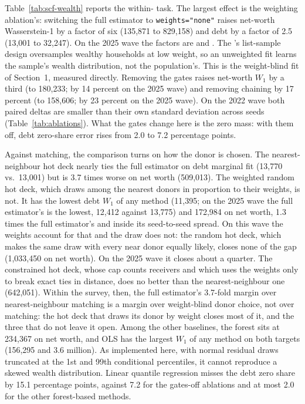 Table~\ref{tab:scf-wealth} reports the within-\scf{} task. The largest
effect is the weighting ablation's: switching the full estimator to
\texttt{weights="none"} raises net-worth Wasserstein-1 by a factor of six
(135,871 to 829,158) and debt by a factor of 2.5 (13,001 to 32,247). On
the 2025 wave the factors are  and
. The
\scf{}'s list-sample design oversamples wealthy households at low weight, so
an unweighted fit learns the sample's wealth distribution, not the
population's. This is the weight-blind fit of Section~1, measured directly.
Removing the gates raises
net-worth $W_1$ by a third (to 180,233; by 14 percent on the 2025 wave) and
removing chaining by 17 percent (to 158,606; by 23 percent on the 2025
wave). On the 2022 wave both paired deltas are smaller than their own
standard deviation across seeds (Table~\ref{tab:ablations}). What the gates change
here is the zero mass: with them off, debt zero-share error rises from 2.0
to 7.2 percentage points.

Against matching, the comparison turns on how the donor is chosen. The
nearest-neighbour hot deck nearly ties the full estimator on debt marginal
fit (13,770 vs.\ 13,001) but is 3.7 times worse on net
worth (509,013). The weighted random hot deck, which draws among the nearest
donors in proportion to their weights, is not. It has the lowest debt
$W_1$ of any method (11,395; on the 2025 wave the full estimator's is the
lowest, 12,412 against 13,775) and 172,984 on net worth, 1.3 times the full
estimator's and inside its seed-to-seed spread. On this wave the weights
account for that and the draw does not: the random hot deck, which makes
the same draw with every near donor equally likely, closes none of the gap
(1,033,450 on net worth). On the 2025 wave it closes about a quarter. The
constrained hot deck, whose cap counts receivers and which uses the weights
only to break exact ties in distance, does no better than the
nearest-neighbour one (642,051). Within
the survey, then, the full estimator's 3.7-fold margin over nearest-neighbour
matching is a margin over weight-blind donor choice, not over matching: the
hot deck that draws its donor by weight closes most of it, and the three
that do not leave it open.
Among the other baselines,
the \microimpute{} forest sits at 234,367 on net worth, and OLS has the
largest $W_1$ of any method on both targets (156,295 and 3.6 million). As
implemented here, with normal residual draws truncated at the 1st and 99th
conditional percentiles, it cannot reproduce a skewed wealth distribution.
Linear quantile regression misses the debt zero share by 15.1 percentage
points, against 7.2 for the gates-off ablations and at most 2.0 for the
other forest-based methods.

